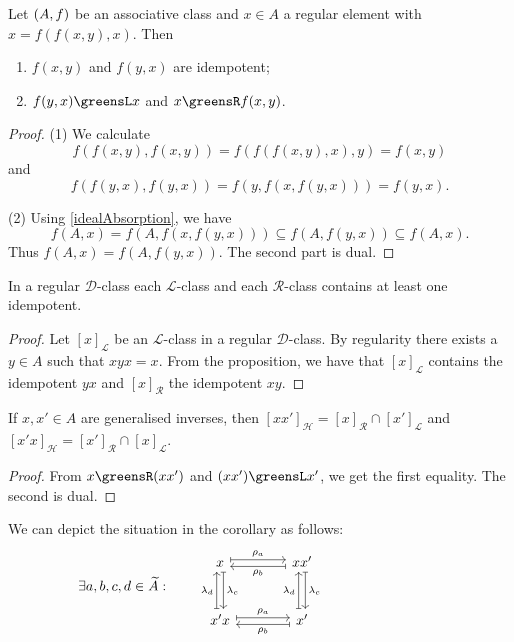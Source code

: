 \begin{proposition} \label{greensRelationsRegularElements}
Let $\left( A, f \right)$ be an associative class and $x\in A$ a regular element with $x = f(f(x, y), x)$. Then
\begin{enumerate}
\item $f(x,y)$ and $f(y,x)$ are idempotent;
\item $f(y,x) \greensL x$ and $x \greensR f(x, y)$.
\end{enumerate}
\end{proposition}
\begin{proof}
(1) We calculate
\[ f(f(x,y), f(x,y)) = f(f(f(x,y), x), y) = f(x, y)\] and \[f(f(y,x), f(y,x)) = f(y, f(x, f(y,x))) = f(y,x). \]

(2) Using \ref{idealAbsorption}, we have
\[ f(A, x) = f(A, f(x,f(y,x))) \subseteq f(A, f(y,x)) \subseteq f(A,x). \]
Thus $f(A, x) = f(A, f(y,x))$. The second part is dual.
\end{proof}
\begin{corollary}
In a regular $\mathcal{D}$-class each $\mathcal{L}$-class and each $\mathcal{R}$-class contains at least one idempotent.
\end{corollary}
\begin{proof}
Let $[x]_\mathcal{L}$ be an $\mathcal{L}$-class in a regular $\mathcal{D}$-class. By regularity there exists a $y\in A$ such that $xyx = x$. From the proposition, we have that $[x]_\mathcal{L}$ contains the idempotent $yx$ and $[x]_\mathcal{R}$ the idempotent $xy$.
\end{proof}
\begin{corollary} \label{idempotentsHclass}
If $x,x'\in A$ are generalised inverses, then $[xx']_\mathcal{H} = [x]_\mathcal{R}\cap [x']_\mathcal{L}$ and $[x'x]_\mathcal{H} = [x']_\mathcal{R}\cap [x]_\mathcal{L}$.
\end{corollary}
\begin{proof}
From $x\greensR (xx')$ and $(xx')\greensL x'$, we get the first equality. The second is dual.
\end{proof}
We can depict the situation in the corollary as follows:
\[ \hspace{-8.4em} \exists a,b,c,d \in \widetilde{A}: \qquad \begin{tikzcd}[sep=large]
x \ar[r, maps to, shift left, "\rho_a"] \ar[d, maps to, shift left, "\lambda_c"] & xx' \ar[l, maps to, shift left, "\rho_b"] \ar[d, maps to, shift left, "\lambda_c"] \\
x'x \ar[u, maps to, shift left, "\lambda_d"] \ar[r, maps to, shift left, "\rho_a"] & x' \ar[u, maps to, shift left, "\lambda_d"] \ar[l, maps to, shift left, "\rho_b"]
\end{tikzcd} \]


